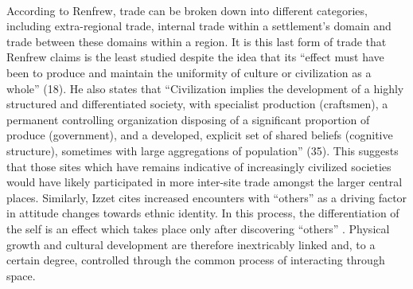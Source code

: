 \documentclass[12pt,a4paper]{thesis}
\begin{document}
\paragraph{}	
According to Renfrew, trade can be broken down into different categories,  including extra-regional trade, internal trade within a settlement's domain and trade between these domains within a region.  It is this last form of trade that Renfrew claims is the least studied despite the idea that its ``effect must have been to produce and maintain the uniformity of culture or civilization as a whole'' (18). He also states that ``Civilization implies the development of a highly structured and differentiated society, with specialist production (craftsmen), a permanent controlling organization disposing of a significant proportion of produce (government), and a developed, explicit set of shared beliefs (cognitive structure), sometimes with large aggregations of population'' (35). This suggests that those sites which have remains indicative of increasingly civilized societies would have likely participated in more inter-site trade amongst the larger central places. Similarly, Izzet cites increased encounters with ``others'' as a driving factor in attitude changes towards ethnic identity. In this process, the differentiation of the self is an effect which takes place only after  discovering ``others'' \citeyearpar[210]{Ize07} . Physical growth and cultural development are therefore inextricably linked and, to a certain degree, controlled through the common process of interacting through space. 
\end{document}

